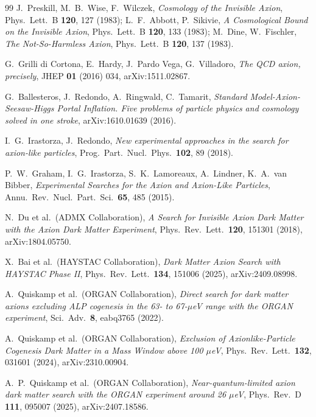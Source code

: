 \documentclass[11pt,a4paper]{article}
\begin{document}
\begin{thebibliography}{99}
J.~Preskill, M.~B.~Wise, F.~Wilczek,
\emph{Cosmology of the Invisible Axion},
Phys.\ Lett.\ B \textbf{120}, 127 (1983);
L.~F.~Abbott, P.~Sikivie,
\emph{A Cosmological Bound on the Invisible Axion},
Phys.\ Lett.\ B \textbf{120}, 133 (1983);
M.~Dine, W.~Fischler,
\emph{The Not-So-Harmless Axion},
Phys.\ Lett.\ B \textbf{120}, 137 (1983).

G.~Grilli di Cortona, E.~Hardy, J.~Pardo Vega, G.~Villadoro,
\emph{The QCD axion, precisely},
JHEP \textbf{01} (2016) 034, arXiv:1511.02867.

G.~Ballesteros, J.~Redondo, A.~Ringwald, C.~Tamarit,
\emph{Standard Model-Axion-Seesaw-Higgs Portal Inflation. Five problems of
particle physics and cosmology solved in one stroke},
arXiv:1610.01639 (2016).

I.~G.~Irastorza, J.~Redondo,
\emph{New experimental approaches in the search for axion-like particles},
Prog.\ Part.\ Nucl.\ Phys.\ \textbf{102}, 89 (2018).

P.~W.~Graham, I.~G.~Irastorza, S.~K.~Lamoreaux, A.~Lindner, K.~A.~van Bibber,
\emph{Experimental Searches for the Axion and Axion-Like Particles},
Annu.\ Rev.\ Nucl.\ Part.\ Sci.\ \textbf{65}, 485 (2015).

N.~Du et al.\ (ADMX Collaboration),
\emph{A Search for Invisible Axion Dark Matter with the Axion Dark Matter Experiment},
Phys.\ Rev.\ Lett.\ \textbf{120}, 151301 (2018), arXiv:1804.05750.

X.~Bai et al.\ (HAYSTAC Collaboration),
\emph{Dark Matter Axion Search with HAYSTAC Phase II},
Phys.\ Rev.\ Lett.\ \textbf{134}, 151006 (2025), arXiv:2409.08998.

A.~Quiskamp et al.\ (ORGAN Collaboration),
\emph{Direct search for dark matter axions excluding ALP cogenesis in the
63- to 67-$\mu$eV range with the ORGAN experiment},
Sci.\ Adv.\ \textbf{8}, eabq3765 (2022).

A.~Quiskamp et al.\ (ORGAN Collaboration),
\emph{Exclusion of Axionlike-Particle Cogenesis Dark Matter in a Mass Window
above 100 $\mu$eV},
Phys.\ Rev.\ Lett.\ \textbf{132}, 031601 (2024), arXiv:2310.00904.

A.~P.~Quiskamp et al.\ (ORGAN Collaboration),
\emph{Near-quantum-limited axion dark matter search with the ORGAN experiment
around 26 $\mu$eV},
Phys.\ Rev.\ D \textbf{111}, 095007 (2025), arXiv:2407.18586.


\end{thebibliography}
\end{document}
